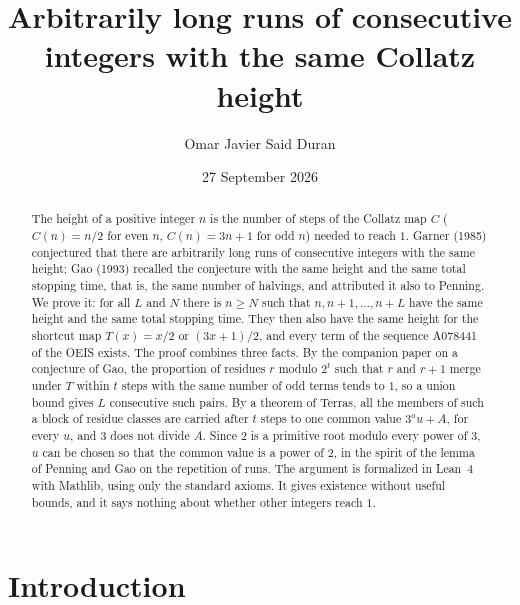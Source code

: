 \documentclass[11pt]{amsart}
\theoremstyle{definition}
\theoremstyle{remark}
\begin{document}
\title[Long runs of equal Collatz height]{Arbitrarily long runs of consecutive integers with the same Collatz height}

\author[O. J. Said Duran]{Omar Javier Said Duran}
\address{Independent Researcher}

\date{27 September 2026}

\begin{abstract}
The height of a positive integer $n$ is the number of steps of the Collatz map $C$ ($C(n)=n/2$ for even $n$, $C(n)=3n+1$ for odd $n$) needed to reach $1$. Garner (1985) conjectured that there are arbitrarily long runs of consecutive integers with the same height; Gao (1993) recalled the conjecture with the same height and the same total stopping time, that is, the same number of halvings, and attributed it also to Penning. We prove it: for all $L$ and $N$ there is $n\ge N$ such that $n,n+1,\dots,n+L$ have the same height and the same total stopping time. They then also have the same height for the shortcut map $T(x)=x/2$ or $(3x+1)/2$, and every term of the sequence A078441 of the OEIS exists. The proof combines three facts. By the companion paper on a conjecture of Gao, the proportion of residues $r$ modulo $2^t$ such that $r$ and $r+1$ merge under $T$ within $t$ steps with the same number of odd terms tends to $1$, so a union bound gives $L$ consecutive such pairs. By a theorem of Terras, all the members of such a block of residue classes are carried after $t$ steps to one common value $3^a u+A$, for every $u$, and $3$ does not divide $A$. Since $2$ is a primitive root modulo every power of $3$, $u$ can be chosen so that the common value is a power of $2$, in the spirit of the lemma of Penning and Gao on the repetition of runs. The argument is formalized in Lean~4 with Mathlib, using only the standard axioms. It gives existence without useful bounds, and it says nothing about whether other integers reach $1$.
\end{abstract}


\maketitle

\section{Introduction}
\end{document}
